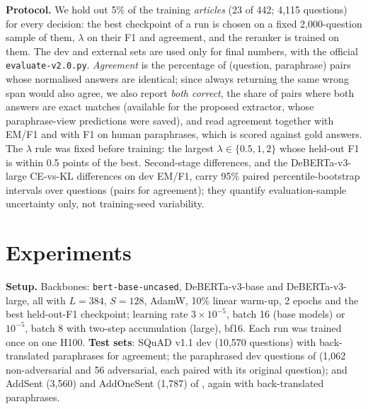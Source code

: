 \documentclass[11pt]{article}
\begin{document}
\textbf{Protocol.}
We hold out 5\% of the training \emph{articles} (23 of 442; 4,115 questions) for every decision: the best checkpoint of a run is chosen on a fixed 2,000-question sample of them, $\lambda$ on their F1 and agreement, and the reranker is trained on them. The dev and external sets are used only for final numbers, with the official \texttt{evaluate-v2.0.py}. \emph{Agreement} is the percentage of (question, paraphrase) pairs whose normalised answers are identical; since always returning the same wrong span would also agree, we also report \emph{both correct}, the share of pairs where both answers are exact matches (available for the proposed extractor, whose paraphrase-view predictions were saved), and read agreement together with EM/F1 and with F1 on human paraphrases, which is scored against gold answers. The $\lambda$ rule was fixed before training: the largest $\lambda\in\{0.5,1,2\}$ whose held-out F1 is within 0.5 points of the best. Second-stage differences, and the DeBERTa-v3-large CE-vs-KL differences on dev EM/F1, carry 95\% paired percentile-bootstrap intervals over questions (pairs for agreement); they quantify evaluation-sample uncertainty only, not training-seed variability.

\section{Experiments}
\label{sec:exp}
\textbf{Setup.} Backbones: \texttt{bert-base-uncased}, DeBERTa-v3-base and DeBERTa-v3-large, all with $L=384$, $S=128$, AdamW, 10\% linear warm-up, 2 epochs and the best held-out-F1 checkpoint; learning rate $3\times10^{-5}$, batch 16 (base models) or $10^{-5}$, batch 8 with two-step accumulation (large), bf16. Each run was trained once on one H100. \textbf{Test sets}: SQuAD v1.1 dev (10,570 questions) with back-translated paraphrases for agreement; the paraphrased dev questions of \citet{gan2019improving} (1,062 non-adversarial and 56 adversarial, each paired with its original question); and AddSent (3,560) and AddOneSent (1,787) of \citet{jia2017adversarial}, again with back-translated paraphrases.


\end{document}
